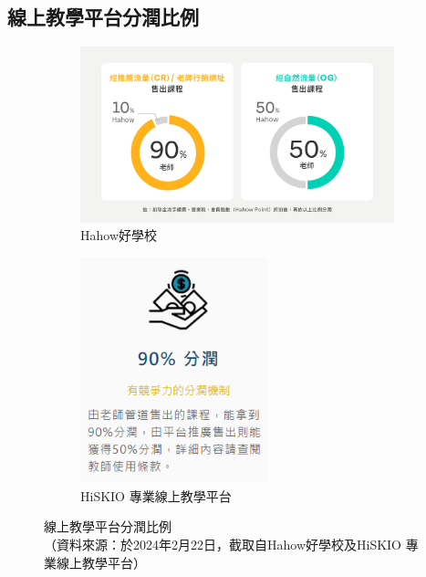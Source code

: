 \subsection{線上教學平台分潤比例}
\label{fig:Appendix-profit-sharing}
\begin{figure}[H]
	\centering
	\begin{subfigure}{0.45\linewidth}
		\centering
		\includegraphics[width=1\textwidth]{images/hahow.png}
		\caption{Hahow好學校}
		\label{fig:Hahow}
	\end{subfigure}
	\begin{subfigure}{0.45\linewidth}
		\centering
		\includegraphics[width=0.6\textwidth]{images/hiskio.png}
		\caption{HiSKIO 專業線上教學平台}
		\label{fig:HiSKIO}
	\end{subfigure}
	\caption[線上教學平台分潤比例]{線上教學平台分潤比例\\（資料來源：於2024年2月22日，截取自Hahow好學校及HiSKIO 專業線上教學平台）}
\end{figure}

